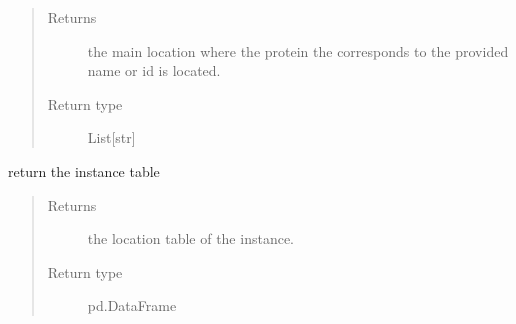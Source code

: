 \documentclass[letterpaper,10pt,english]{sphinxmanual}
\begin{document}
\begin{fulllineitems}
\begin{fulllineitems}
\begin{quote}
\begin{description}
\begin{itemize}
\end{itemize}

\item[{Returns}] \leavevmode
the main location where the protein the corresponds to the provided name or id is located.

\item[{Return type}] \leavevmode
List{[}str{]}

\end{description}\end{quote}

\end{fulllineitems}


\begin{fulllineitems}
\label{\detokenize{IPTK.Classes:IPTK.Classes.Database.CellularLocationDB.get_table}}
return the instance table
\begin{quote}\begin{description}
\item[{Returns}] \leavevmode
the location table of the instance.

\item[{Return type}] \leavevmode
pd.DataFrame

\end{description}\end{quote}

\end{fulllineitems}


\end{fulllineitems}

\end{document}

